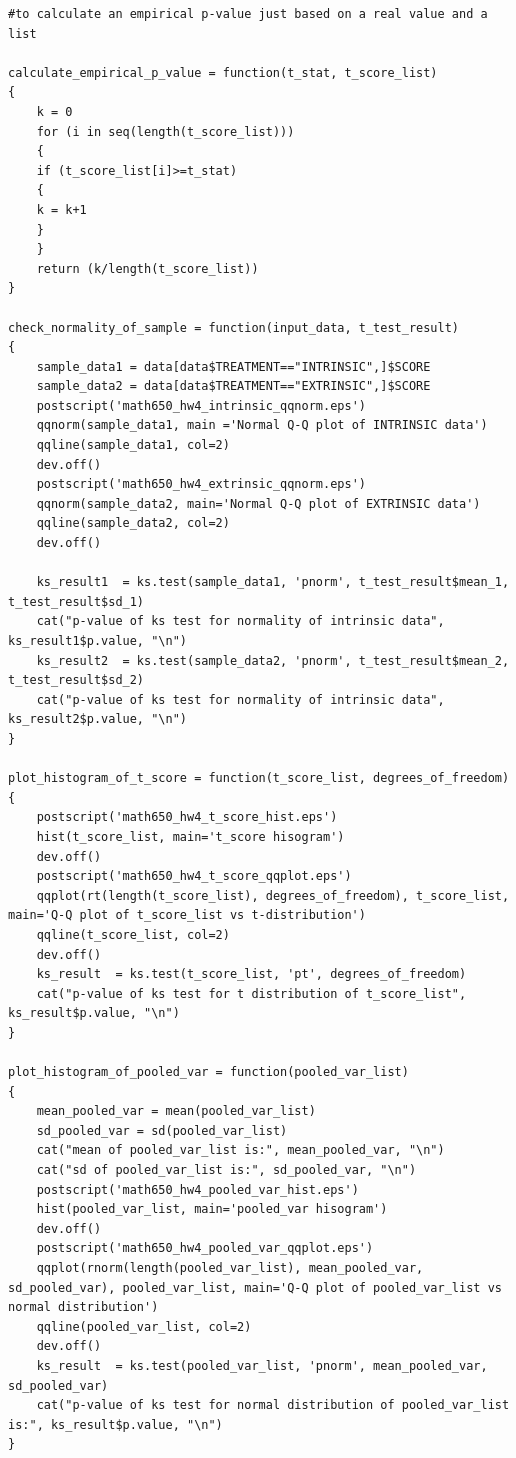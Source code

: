 \documentclass[a4paper,10pt]{article}
\begin{document}
\begin{verbatim}
#to calculate an empirical p-value just based on a real value and a list

calculate_empirical_p_value = function(t_stat, t_score_list)
{
	k = 0
	for (i in seq(length(t_score_list)))
	{
	if (t_score_list[i]>=t_stat)
	{
	k = k+1
	}
	}
	return (k/length(t_score_list))
}

check_normality_of_sample = function(input_data, t_test_result)
{
	sample_data1 = data[data$TREATMENT=="INTRINSIC",]$SCORE
	sample_data2 = data[data$TREATMENT=="EXTRINSIC",]$SCORE
	postscript('math650_hw4_intrinsic_qqnorm.eps')
	qqnorm(sample_data1, main ='Normal Q-Q plot of INTRINSIC data')
	qqline(sample_data1, col=2)
	dev.off()
	postscript('math650_hw4_extrinsic_qqnorm.eps')
	qqnorm(sample_data2, main='Normal Q-Q plot of EXTRINSIC data')
	qqline(sample_data2, col=2)
	dev.off()
	
	ks_result1  = ks.test(sample_data1, 'pnorm', t_test_result$mean_1, t_test_result$sd_1)
	cat("p-value of ks test for normality of intrinsic data", ks_result1$p.value, "\n")
	ks_result2  = ks.test(sample_data2, 'pnorm', t_test_result$mean_2, t_test_result$sd_2)
	cat("p-value of ks test for normality of intrinsic data", ks_result2$p.value, "\n")
}

plot_histogram_of_t_score = function(t_score_list, degrees_of_freedom)
{
	postscript('math650_hw4_t_score_hist.eps')
	hist(t_score_list, main='t_score hisogram')
	dev.off()
	postscript('math650_hw4_t_score_qqplot.eps')
	qqplot(rt(length(t_score_list), degrees_of_freedom), t_score_list, main='Q-Q plot of t_score_list vs t-distribution')
	qqline(t_score_list, col=2)
	dev.off()
	ks_result  = ks.test(t_score_list, 'pt', degrees_of_freedom)
	cat("p-value of ks test for t distribution of t_score_list", ks_result$p.value, "\n")
}

plot_histogram_of_pooled_var = function(pooled_var_list)
{
	mean_pooled_var = mean(pooled_var_list)
	sd_pooled_var = sd(pooled_var_list)
	cat("mean of pooled_var_list is:", mean_pooled_var, "\n")
	cat("sd of pooled_var_list is:", sd_pooled_var, "\n")
	postscript('math650_hw4_pooled_var_hist.eps')
	hist(pooled_var_list, main='pooled_var hisogram')
	dev.off()
	postscript('math650_hw4_pooled_var_qqplot.eps')
	qqplot(rnorm(length(pooled_var_list), mean_pooled_var, sd_pooled_var), pooled_var_list, main='Q-Q plot of pooled_var_list vs normal distribution')
	qqline(pooled_var_list, col=2)
	dev.off()
	ks_result  = ks.test(pooled_var_list, 'pnorm', mean_pooled_var, sd_pooled_var)
	cat("p-value of ks test for normal distribution of pooled_var_list is:", ks_result$p.value, "\n")
}


\end{verbatim}
\end{document}
